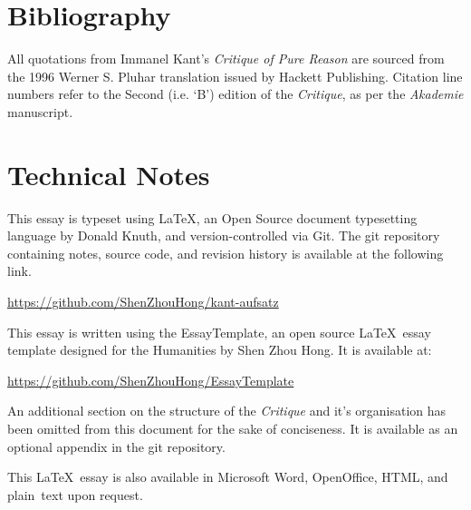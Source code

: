 \section*{Bibliography}
All quotations from Immanel Kant's \emph{Critique of Pure Reason} are sourced from the 1996 Werner S. Pluhar translation issued by Hackett Publishing. Citation line numbers refer to the Second (i.e. `B') edition of the \emph{Critique}, as per the \emph{Akademie} manuscript.
\nocite{*}
\printbibliography[heading=none]

\section*{Technical Notes}
This essay is typeset using \LaTeX, an Open Source document typesetting language
by Donald Knuth, and version-controlled via Git. The git repository containing notes, source code, and revision history is available at the following link.

\url{https://github.com/ShenZhouHong/kant-aufsatz}

\noindent
This essay is written using the EssayTemplate, an open source \LaTeX\ essay
template designed for the Humanities by Shen Zhou Hong. It is available at:

\url{https://github.com/ShenZhouHong/EssayTemplate}

\noindent
An additional section on the structure of the \emph{Critique} and it's organisation has been omitted from this document for the sake of conciseness. It is available as an optional appendix in the git repository.

\vfill
\begin{center}
This \LaTeX\ essay is also available in Microsoft Word, OpenOffice, HTML, and \mbox{plain text} upon request.
\end{center}
